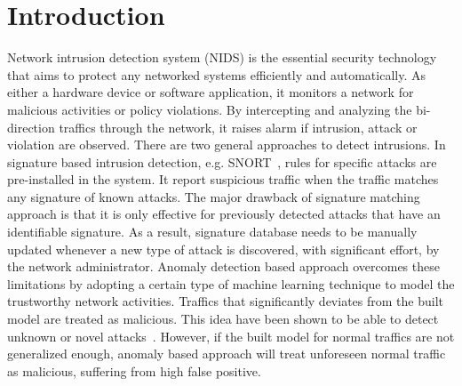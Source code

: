 \section{Introduction}

Network intrusion detection system (NIDS) is the essential security technology that
aims to protect any networked systems efficiently and automatically.
As either a hardware device or software application,
it monitors a network for malicious activities or policy violations.
By intercepting and analyzing the bi-direction traffics through the network,
it raises alarm if intrusion, attack or violation are observed.
There are two general approaches to detect intrusions.
In signature based intrusion detection, e.g. SNORT~\cite{Snort},
rules for specific attacks are pre-installed in the system.
It report suspicious traffic when the traffic matches any signature of known attacks.
The major drawback of signature matching approach is that
it is only effective for previously detected attacks that have an identifiable signature.
As a result, signature database needs to be manually updated whenever a new type of attack
is discovered, with significant effort, by the network administrator.
Anomaly detection based approach overcomes these limitations by adopting a certain
type of machine learning technique to model the trustworthy network activities.
Traffics that significantly deviates from the built model are treated as malicious.
This idea have been shown to be able to detect unknown or novel attacks~\cite{NSL-KDD, STL-NIDS}.
However, if the built model for normal traffics are not generalized enough,
anomaly based approach will treat unforeseen normal traffic as malicious,
suffering from high false positive.

